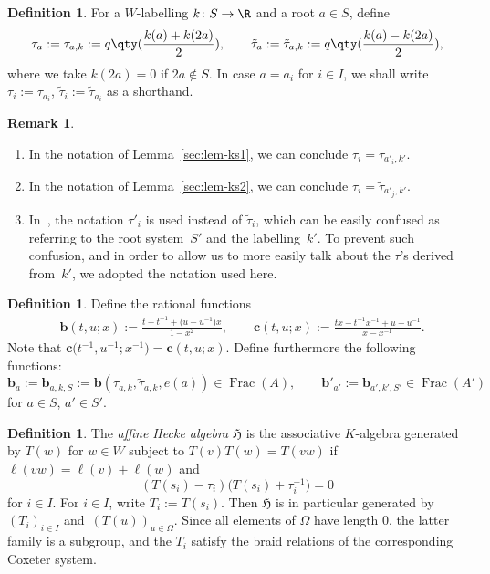 \documentclass[10pt,a4paper]{amsart}
\theoremstyle{definition}
\newtheorem{Definition}[Theorem]{Definition}
\newtheorem{Remark}[Theorem]{Remark}
\numberwithin{equation}{section}
\begin{document}
\begin{Definition}\label{def-tau}
 For a $W$-labelling $k\colon S\to\R$ and a root $a\in S$, define
 \[
 \tau_a := \tau_{a,k}:= q\qty(\frac{k(a)+k(2a)}{2}),\qquad
 \tilde{\tau}_a := \tilde{\tau}_{a,k} := q\qty(\frac{k(a)-k(2a)}{2}),
 \]
 where we take $k(2a)=0$ if $2a\not\in S$. In case $a=a_i$ for $i\in I$, we shall write
$\tau_i := \tau_{a_i}$, $ \tilde{\tau}_i := \tilde{\tau}_{a_i}$
 as a shorthand.
\end{Definition}

\begin{Remark}\label{sec:rem-taus}\leavevmode
\begin{enumerate}\itemsep=0pt
 \item[(i)] In the notation of Lemma~\ref{sec:lem-ks1},
 we can conclude
$
 \tau_i = \tau_{a'_i,k'}$.
 \item[(ii)] In the notation of Lemma~\ref{sec:lem-ks2}, we can conclude
$
 \tau_i = \tilde{\tau}_{a'_j,k'}$.
 \item[(iii)] In~\cite{macdonald}, the notation $\tau'_i$ is used instead of
 $\tilde{\tau}_i$, which can be easily confused as referring to the root system~$S'$ and the labelling~$k'$. To prevent such confusion, and in order to allow us
 to more easily talk about the $\tau$'s derived from~$k'$, we adopted the notation
 used here.
\end{enumerate}
\end{Remark}

\begin{Definition}
 Define the rational functions
 \begin{align*}
& \bm{b}(t,u;x):= \frac{t-t^{-1} + \bigl(u-u^{-1}\bigr)x}{1-x^2},\qquad
 \bm{c}(t,u;x) := \frac{tx - t^{-1}x^{-1} + u-u^{-1}}{x-x^{-1}}.
 \end{align*}
 Note that $\bm{c}\bigl(t^{-1},u^{-1};x^{-1}\bigr)=\bm{c}(t,u;x)$. Define
 furthermore the following functions:
 \[
 \bm{b}_a := \bm{b}_{a,k,S} := \bm{b}(\tau_{a,k},\tilde{\tau}_{a,k}, e(a))\in \operatorname{Frac}(A),\qquad
 \bm{b}'_{a'} := \bm{b}_{a',k',S'}\in\operatorname{Frac}(A')
 \]
 for $a\in S$, $a'\in S'$.
\end{Definition}

\begin{Definition}
 The \emph{affine Hecke algebra} $\mathfrak{H}$ is the associative $K$-algebra generated by
 $T(w)$ for $w\in W$ subject to
$
 T(v)T(w)=T(vw)$ if $ \ell(vw)=\ell(v)+\ell(w)$
 and
 \[
 (T(s_i)-\tau_i)\bigl(T(s_i)+\tau_i^{-1}\bigr) = 0
 \]
 for $i\in I$. For $i\in I$, write $T_i:= T(s_i)$. Then
 $\mathfrak{H}$ is in particular generated by $(T_i)_{i\in I}$ and~$(T(u))_{u\in\Omega}$. Since all elements of $\Omega$ have length 0,
 the latter family is a subgroup, and the $T_i$ satisfy the braid relations
 of the corresponding Coxeter system.
\end{Definition}
\end{document}
